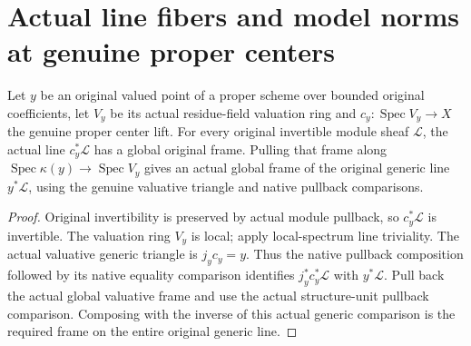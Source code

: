 \section{Actual line fibers and model norms at genuine proper centers}

\begin{lemma}
\label{lem:scheme-line-actual-center-frame}
\leanok
{}
Let $y$ be an original valued point of a proper scheme over bounded
original coefficients, let $V_y$ be its actual residue-field valuation
ring and $c_y:\operatorname{Spec}V_y\to X$ the genuine proper center
lift. For every original invertible module sheaf $\mathcal L$, the
actual line $c_y^*\mathcal L$ has a global original frame. Pulling
that frame along $\operatorname{Spec}\kappa(y)\to\operatorname{Spec}V_y$
gives an actual global frame of the original generic line
$y^*\mathcal L$, using the genuine valuative triangle and native
pullback comparisons.
\end{lemma}
\begin{proof}
Original invertibility is preserved by actual module pullback, so
$c_y^*\mathcal L$ is invertible. The valuation ring $V_y$ is local;
apply local-spectrum line triviality. The actual valuative generic
triangle is $j_yc_y=y$. Thus the native pullback composition followed
by its native equality comparison identifies $j_y^*c_y^*\mathcal L$
with $y^*\mathcal L$. Pull back the actual global valuative frame and
use the actual structure-unit pullback comparison. Composing with
the inverse of this actual generic comparison is the required frame
on the entire original generic line.
\end{proof}

